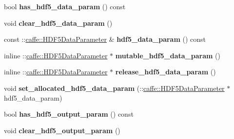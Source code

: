 \begin{DoxyCompactItemize}
bool {\bfseries has\+\_\+hdf5\+\_\+data\+\_\+param} () const
\item 
\mbox{\label{classcaffe_1_1_v1_layer_parameter_a6d21069448939d0a08e1ad40018447e1}} 
void {\bfseries clear\+\_\+hdf5\+\_\+data\+\_\+param} ()
\item 
\mbox{\label{classcaffe_1_1_v1_layer_parameter_a7a002a6767988c9d69f1decdf5a790c5}} 
const \+::\mbox{\hyperlink{classcaffe_1_1_h_d_f5_data_parameter}{caffe\+::\+H\+D\+F5\+Data\+Parameter}} \& {\bfseries hdf5\+\_\+data\+\_\+param} () const
\item 
\mbox{\label{classcaffe_1_1_v1_layer_parameter_a1430936577e77f943f7173f9db05ac59}} 
inline \+::\mbox{\hyperlink{classcaffe_1_1_h_d_f5_data_parameter}{caffe\+::\+H\+D\+F5\+Data\+Parameter}} $\ast$ {\bfseries mutable\+\_\+hdf5\+\_\+data\+\_\+param} ()
\item 
\mbox{\label{classcaffe_1_1_v1_layer_parameter_a119ebe4b654c6aca163482ae157c08db}} 
inline \+::\mbox{\hyperlink{classcaffe_1_1_h_d_f5_data_parameter}{caffe\+::\+H\+D\+F5\+Data\+Parameter}} $\ast$ {\bfseries release\+\_\+hdf5\+\_\+data\+\_\+param} ()
\item 
\mbox{\label{classcaffe_1_1_v1_layer_parameter_a462a890f0509f6681836f22999c7f5da}} 
void {\bfseries set\+\_\+allocated\+\_\+hdf5\+\_\+data\+\_\+param} (\+::\mbox{\hyperlink{classcaffe_1_1_h_d_f5_data_parameter}{caffe\+::\+H\+D\+F5\+Data\+Parameter}} $\ast$hdf5\+\_\+data\+\_\+param)
\item 
\mbox{\label{classcaffe_1_1_v1_layer_parameter_af9ef4f0b815a754541aae4cd2471688d}} 
bool {\bfseries has\+\_\+hdf5\+\_\+output\+\_\+param} () const
\item 
\mbox{\label{classcaffe_1_1_v1_layer_parameter_a348da83622fd178b6579385ea360dd37}} 
void {\bfseries clear\+\_\+hdf5\+\_\+output\+\_\+param} ()
\item 
\mbox{\label{classcaffe_1_1_v1_layer_parameter_a592ef5d3c6f633f84b65775071609d73}} 

\end{DoxyCompactItemize}
